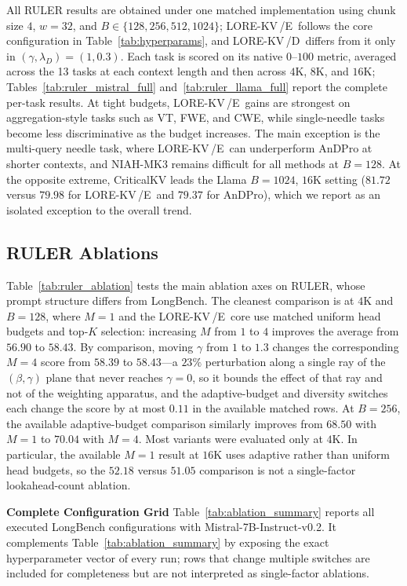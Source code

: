 \documentclass{article} %
\newcommand{\lorekvE}{LORE-KV\,/E}
\newcommand{\lorekvD}{LORE-KV\,/D}
\begin{document}
All RULER results are obtained under one matched implementation using chunk size $4$, $w{=}32$, and $B\in\{128,256,512,1024\}$; \lorekvE\ follows the core configuration in Table~\ref{tab:hyperparams}, and \lorekvD\ differs from it only in $(\gamma,\lambda_D)=(1,0.3)$. Each task is scored on its native $0$--$100$ metric, averaged across the 13 tasks at each context length and then across $4$K, $8$K, and $16$K; Tables~\ref{tab:ruler_mistral_full} and~\ref{tab:ruler_llama_full} report the complete per-task results. At tight budgets, \lorekvE\ gains are strongest on aggregation-style tasks such as VT, FWE, and CWE, while single-needle tasks become less discriminative as the budget increases. The main exception is the multi-query needle task, where \lorekvE\ can underperform AnDPro at shorter contexts, and NIAH-MK3 remains difficult for all methods at $B{=}128$. At the opposite extreme, CriticalKV leads the Llama $B{=}1024$, $16$K setting ($81.72$ versus $79.98$ for \lorekvE\ and $79.37$ for AnDPro), which we report as an isolated exception to the overall trend.


\subsection{RULER Ablations} \label{app:ruler_ablation}
Table~\ref{tab:ruler_ablation} tests the main ablation axes on RULER, whose prompt structure differs from LongBench. The cleanest comparison is at $4$K and $B{=}128$, where $M{=}1$ and the \lorekvE\ core use matched uniform head budgets and top-$K$ selection: increasing $M$ from $1$ to $4$ improves the average from $56.90$ to $58.43$. By comparison, moving $\gamma$ from $1$ to $1.3$ changes the corresponding $M{=}4$ score from $58.39$ to $58.43$---a $23\%$ perturbation along a single ray of the $(\beta,\gamma)$ plane that never reaches $\gamma{=}0$, so it bounds the effect of that ray and not of the weighting apparatus, and the adaptive-budget and diversity switches each change the score by at most $0.11$ in the available matched rows. At $B{=}256$, the available adaptive-budget comparison similarly improves from $68.50$ with $M{=}1$ to $70.04$ with $M{=}4$. Most variants were evaluated only at $4$K. In particular, the available $M{=}1$ result at $16$K uses adaptive rather than uniform head budgets, so the $52.18$ versus $51.05$ comparison is not a single-factor lookahead-count ablation.

\textbf{Complete Configuration Grid} Table~\ref{tab:ablation_summary} reports all executed LongBench configurations with Mistral-7B-Instruct-v0.2. It complements Table~\ref{tab:ablation_summary} by exposing the exact hyperparameter vector of every run; rows that change multiple switches are included for completeness but are not interpreted as single-factor ablations.
\end{document}
